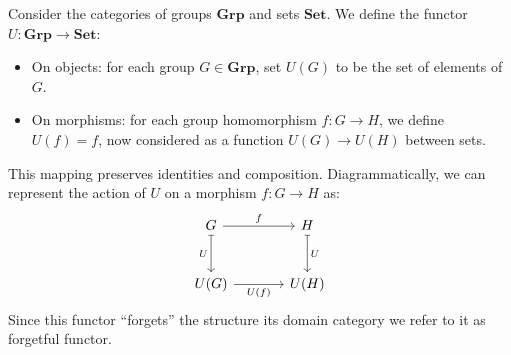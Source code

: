 \begin{example} Consider the categories of groups $\mathbf{Grp}$ and sets $\mathbf{Set}$. 
We define the functor \( U : \mathbf{Grp} \longrightarrow \mathbf{Set} \):
\begin{itemize}
    \item On objects: for each group $G \in \mathbf{Grp}$, set $U(G)$ to be the set of elements of $G$. 
    \item On morphisms: for each group homomorphism $f: G \to H$, we define $U(f) = f$, now considered as a function $U(G) \to U(H)$ between sets.
\end{itemize}
This mapping preserves identities and composition. Diagrammatically, we can represent the action of $U$ on a morphism $f : G \to H$ as:
\[
        \begin{tikzcd}[row sep=large, column sep=large]
          G \arrow[r, "f"] \arrow[d, mapsto, "U"'] & H \arrow[d, mapsto, "U"] \\
          U(G) \arrow[r, "U(f)"'] & U(H)
\end{tikzcd}
\]
Since this functor ``forgets'' the structure its domain category we refer to it as forgetful functor.
\end{example}


